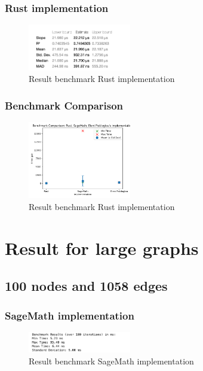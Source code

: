 \subsubsection*{Rust implementation}
\begin{figure}[!h]
    \centering
    \includegraphics[width=0.40\textwidth]{images/benchmark/digraph/benchmark_digraph_rust}
    \caption{Result benchmark Rust implementation}
    \label{fig:benchmark-digraph-rust}
\end{figure}

\subsubsection*{Benchmark Comparison}
\begin{figure}[!h]
    \centering
    \includegraphics[width=0.40\textwidth]{images/benchmark/digraph/benchmark_comparison_digraph}
    \caption{Result benchmark Rust implementation}
    \label{fig:benchmark-comparison-digraph}
\end{figure}


\newpage


\section{Result for large graphs}\label{sec:result-for-large-graphs}

\subsection{100 nodes and 1058 edges}\label{subsec:result-for-graphs-100-1058}

\subsubsection*{SageMath implementation}
\begin{figure}[!h]
    \centering
    \includegraphics[width=0.40\textwidth]{images/benchmark/large_graph/benchmark_large_graph_sagemath}
    \caption{Result benchmark SageMath implementation}
    \label{fig:benchmark-large-graph-sagemath}
\end{figure}

